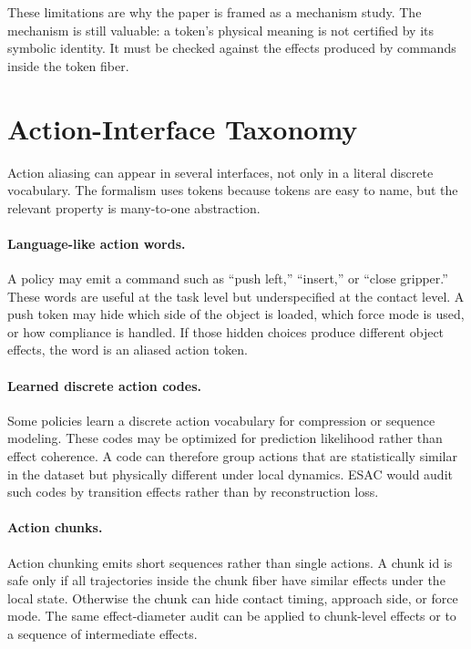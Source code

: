 \documentclass{article}
\begin{document}
These limitations are why the paper is framed as a mechanism study. The
mechanism is still valuable: a token's physical meaning is not certified by its
symbolic identity. It must be checked against the effects produced by commands
inside the token fiber.

\section{Action-Interface Taxonomy}

Action aliasing can appear in several interfaces, not only in a literal
discrete vocabulary. The formalism uses tokens because tokens are easy to name,
but the relevant property is many-to-one abstraction.

\paragraph{Language-like action words.}
A policy may emit a command such as ``push left,'' ``insert,'' or ``close
gripper.'' These words are useful at the task level but underspecified at the
contact level. A push token may hide which side of the object is loaded, which
force mode is used, or how compliance is handled. If those hidden choices
produce different object effects, the word is an aliased action token.

\paragraph{Learned discrete action codes.}
Some policies learn a discrete action vocabulary for compression or sequence
modeling. These codes may be optimized for prediction likelihood rather than
effect coherence. A code can therefore group actions that are statistically
similar in the dataset but physically different under local dynamics. ESAC
would audit such codes by transition effects rather than by reconstruction
loss.

\paragraph{Action chunks.}
Action chunking emits short sequences rather than single actions. A chunk id is
safe only if all trajectories inside the chunk fiber have similar effects under
the local state. Otherwise the chunk can hide contact timing, approach side, or
force mode. The same effect-diameter audit can be applied to chunk-level
effects or to a sequence of intermediate effects.
\end{document}
